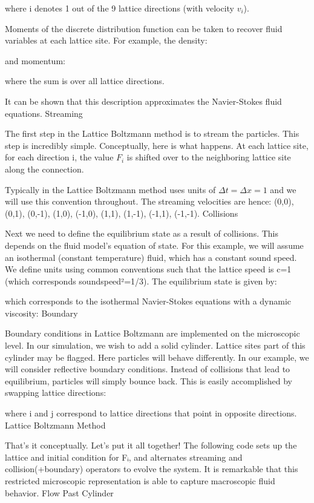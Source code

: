 \documentclass{article}
\begin{document}
where i denotes 1 out of the 9 lattice directions (with velocity $v_i$).

Moments of the discrete distribution function can be taken to recover fluid variables at each lattice site. For example, the density:

and momentum:

where the sum is over all lattice directions.

It can be shown that this description approximates the Navier-Stokes fluid equations.
Streaming

The first step in the Lattice Boltzmann method is to stream the particles. This step is incredibly simple. Conceptually, here is what happens. At each lattice site, for each direction i, the value $F_i$ is shifted over to the neighboring lattice site along the connection.

Typically in the Lattice Boltzmann method uses units of $Δt=Δx=1$ and we will use this convention throughout. The streaming velocities are hence: (0,0), (0,1), (0,-1), (1,0), (-1,0), (1,1), (1,-1), (-1,1), (-1,-1).
Collisions

Next we need to define the equilibrium state as a result of collisions. This depends on the fluid model’s equation of state. For this example, we will assume an isothermal (constant temperature) fluid, which has a constant sound speed. We define units using common conventions such that the lattice speed is c=1 (which corresponds soundspeed²=1/3). The equilibrium state is given by:

which corresponds to the isothermal Navier-Stokes equations with a dynamic viscosity:
Boundary

Boundary conditions in Lattice Boltzmann are implemented on the microscopic level. In our simulation, we wish to add a solid cylinder. Lattice sites part of this cylinder may be flagged. Here particles will behave differently. In our example, we will consider reflective boundary conditions. Instead of collisions that lead to equilibrium, particles will simply bounce back. This is easily accomplished by swapping lattice directions:

where i and j correspond to lattice directions that point in opposite directions.
Lattice Boltzmann Method

That’s it conceptually. Let’s put it all together! The following code sets up the lattice and initial condition for Fᵢ, and alternates streaming and collision(+boundary) operators to evolve the system. It is remarkable that this restricted microscopic representation is able to capture macroscopic fluid behavior.
Flow Past Cylinder
\end{document}
